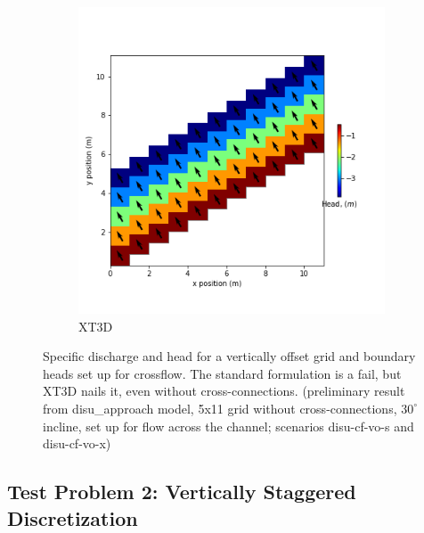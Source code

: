 \documentclass{article}
\begin{document}
\begin{figure}[H]
\begin{subfigure}{0.4\textwidth}
	\includegraphics[width=\textwidth]{../figures/disu-cf-vo-x-head.png}
	\caption{XT3D}
	\label{fig:disu-x-nocc-cf-head}
\end{subfigure}
\caption{Specific discharge and head for a vertically offset grid and boundary heads set up for crossflow. The standard formulation is a fail, but XT3D nails it, even without cross-connections. (preliminary result from disu\_approach model, 5x11 grid without cross-connections, $30^{\circ}$ incline, set up for flow across the channel; scenarios disu-cf-vo-s and disu-cf-vo-x)}
\label{fig:figures}
\end{figure}

\subsection{Test Problem 2: Vertically Staggered Discretization}
\end{document}
